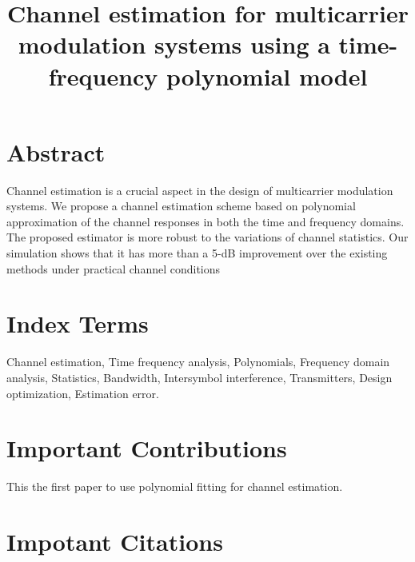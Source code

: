 \documentclass[11pt,draftnofoot,onecolumn]{IEEEtran}
\def\spacingset#1{\def\baselinestretch{#1}\small\normalsize}
\begin{document}
\spacingset{1.5}


\title{Channel estimation for multicarrier modulation systems using a time-frequency polynomial model}
%
\author{
\and {}
%
}
%
%
\maketitle%
%


\section*{Abstract}

Channel estimation is a crucial aspect in the design of multicarrier modulation systems. We propose a channel estimation scheme based on polynomial approximation of the channel responses in both the time and frequency domains. The proposed estimator is more robust to the variations of channel statistics. Our simulation shows that it has more than a 5-dB improvement over the existing methods under practical channel conditions


\section*{ Index Terms}

Channel estimation,
Time frequency analysis,
Polynomials,
Frequency domain analysis,
Statistics,
Bandwidth,
Intersymbol interference,
Transmitters,
Design optimization,
Estimation error.


\section*{Important Contributions}

This the first paper to use polynomial fitting for channel estimation.


\section*{Impotant Citations}







\end{document}
